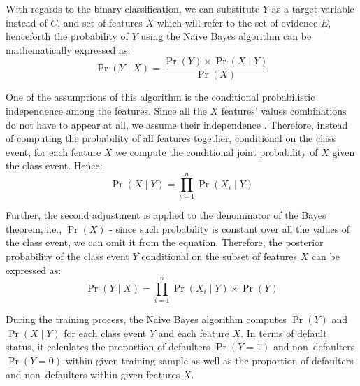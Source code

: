 With regards to the binary classification, we can substitute $Y$ as a target variable instead of $C$, and set of features $X$ which will refer to the set of evidence $E$, henceforth the probability of $Y$ using the Naive Bayes algorithm can be mathematically expressed as:
\begin{equation}\label{eq}
    \operatorname{Pr}\left(Y \mid X \right) = \frac{\operatorname{Pr}\left(Y\right) \times \operatorname{Pr}\left(X \mid Y \right)}{\operatorname{Pr}\left(X\right)}
\end{equation}

One of the assumptions of this algorithm is the conditional probabilistic independence among the features.
Since all the $X$ features' values combinations do not have to appear at all, we assume their independence \citep{cichosz2014data}.
Therefore, instead of computing the probability of all features together, conditional on the class event, for each feature $X$ we compute the conditional joint probability of $X$ given the class event. Hence:
\begin{equation}\label{eq}
    \operatorname{Pr}\left(X  \mid Y \right) = \prod_{i=1}^{n} \operatorname{Pr}\left(X_i \mid Y\right)
\end{equation}

Further, the second adjustment is applied to the denominator of the Bayes theorem, i.e., $\operatorname{Pr}\left(X\right)$ - since such probability is constant over all the values of the class event, we can omit it from the equation. Therefore, the posterior probability of the class event $Y$ conditional on the subset of features $X$ can be expressed as:
\begin{equation}\label{eq}
    \operatorname{Pr}\left(Y \mid X \right) = \prod_{i=1}^{n} \operatorname{Pr}\left(X_i \mid Y\right) \times \operatorname{Pr}\left(Y\right)
\end{equation}

During the training process, the Naive Bayes algorithm computes $\operatorname{Pr}\left(Y\right)$ and $ \operatorname{Pr}\left(X \mid Y \right)$ for each class event $Y$ and each feature $X$.
In terms of default status, it calculates the proportion of defaulters  $\operatorname{Pr}\left(Y = 1\right)$ and non--defaulters $\operatorname{Pr}\left(Y=0\right)$ within given training sample as well as the proportion of defaulters and non--defaulters within given features $X$.


